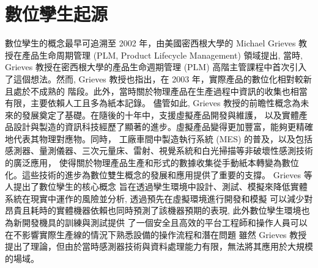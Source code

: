 \section{數位孿生起源}
數位孿生的概念最早可追溯至 2002 年，由美國密西根大學的 Michael Grieves 教授\cite{Grieves2015DigitalTwin}在產品生命周期管理 (PLM, Product Lifecycle Management) 領域提出,
當時, Grieves 教授在密西根大學的產品生命週期管理 (PLM) 高階主管課程中首次引入了這個想法。然而, Grieves 教授也指出，在 2003 年，實際產品的數位化相對較新且處於不成熟的
階段。此外，當時關於物理產品在生產過程中資訊的收集也相當有限，主要依賴人工且多為紙本記錄。
儘管如此, Grieves 教授的前瞻性概念為未來的發展奠定了基礎。在隨後的十年中，支援虛擬產品開發與維護，
以及實體產品設計與製造的資訊科技經歷了顯著的進步。虛擬產品變得更加豐富，能夠更精確地代表其物理對應物。同時，
工廠車間中製造執行系統 (MES) 的普及，以及包括感測器、量測儀器、三次元量床、雷射、視覺系統和白光掃描等非破壞性感測技術的廣泛應用，
使得關於物理產品生產和形式的數據收集從手動紙本轉變為數位化。這些技術的進步為數位雙生概念的發展和應用提供了重要的支撐。
Grieves 等人\cite{Grieves2017DigitalTwin}提出了數位孿生的核心概念
旨在透過孿生環境中設計、測試、模擬來降低實體系統在現實中運作的風險並分析, 透過預先在虛擬環境進行開發和模擬
可以減少對昂貴且耗時的實體機器依賴也同時預測了該機器預期的表現, 此外數位孿生環境也為新開發機具的訓練與測試提供
了一個安全且高效的平台工程師和操作人員可以在不影響實際生產線的情況下熟悉設備的操作流程和潛在問題
雖然 Grieves 教授提出了理論，但由於當時感測器技術與資料處理能力有限，無法將其應用於大規模的場域。
